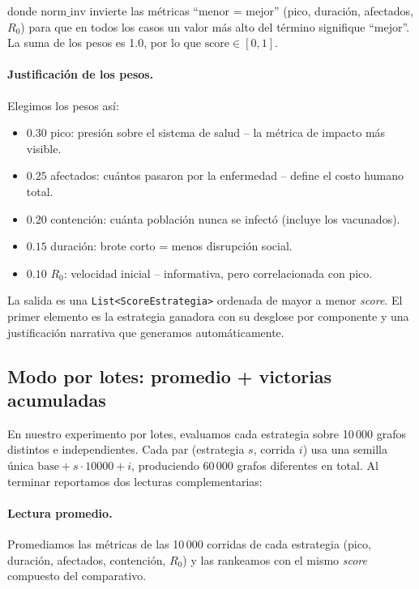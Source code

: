 \documentclass[spanish,notitlepage,letterpaper, 12pt]{article}
\begin{document}
donde $\text{norm\_inv}$ invierte las m\'etricas ``menor = mejor'' (pico, duraci\'on, afectados, $R_0$) para que en todos los casos un valor m\'as alto del t\'ermino signifique ``mejor''. La suma de los pesos es 1.0, por lo que $\text{score} \in [0, 1]$.

\paragraph{Justificaci\'on de los pesos.} Elegimos los pesos as\'i:

\begin{itemize}
    \item $0.30$ pico: presi\'on sobre el sistema de salud -- la m\'etrica de impacto m\'as visible.
    \item $0.25$ afectados: cu\'antos pasaron por la enfermedad -- define el costo humano total.
    \item $0.20$ contenci\'on: cu\'anta poblaci\'on nunca se infect\'o (incluye los vacunados).
    \item $0.15$ duraci\'on: brote corto = menos disrupci\'on social.
    \item $0.10$ $R_0$: velocidad inicial -- informativa, pero correlacionada con pico.
\end{itemize}

La salida es una \texttt{List<ScoreEstrategia>} ordenada de mayor a menor \textit{score}. El primer elemento es la estrategia ganadora con su desglose por componente y una justificaci\'on narrativa que generamos autom\'aticamente.

\subsection{Modo por lotes: promedio + victorias acumuladas}

En nuestro experimento por lotes, evaluamos cada estrategia sobre 10\,000 grafos distintos e independientes. Cada par (estrategia $s$, corrida $i$) usa una semilla \'unica $\text{base} + s \cdot 10000 + i$, produciendo 60\,000 grafos diferentes en total. Al terminar reportamos dos lecturas complementarias:

\paragraph{Lectura promedio.} Promediamos las m\'etricas de las 10\,000 corridas de cada estrategia (pico, duraci\'on, afectados, contenci\'on, $R_0$) y las rankeamos con el mismo \textit{score} compuesto del comparativo.
\end{document}
